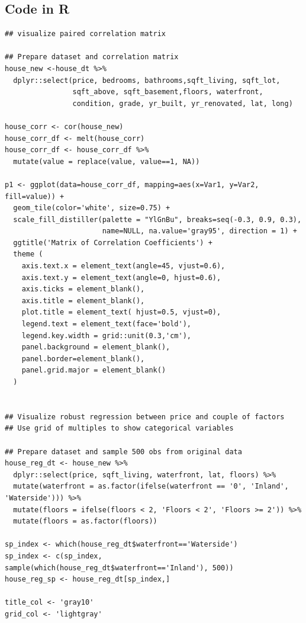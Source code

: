 \documentclass[11pt,letterpaper]{article}
\begin{document}
\newpage

\subsection*{Code in R}
\begin{verbatim}
## visualize paired correlation matrix

## Prepare dataset and correlation matrix
house_new <-house_dt %>% 
  dplyr::select(price, bedrooms, bathrooms,sqft_living, sqft_lot, 
                sqft_above, sqft_basement,floors, waterfront, 
                condition, grade, yr_built, yr_renovated, lat, long)

house_corr <- cor(house_new)
house_corr_df <- melt(house_corr)
house_corr_df <- house_corr_df %>% 
  mutate(value = replace(value, value==1, NA))

p1 <- ggplot(data=house_corr_df, mapping=aes(x=Var1, y=Var2, fill=value)) +
  geom_tile(color='white', size=0.75) + 
  scale_fill_distiller(palette = "YlGnBu", breaks=seq(-0.3, 0.9, 0.3), 
                       name=NULL, na.value='gray95', direction = 1) +
  ggtitle('Matrix of Correlation Coefficients') +
  theme (
    axis.text.x = element_text(angle=45, vjust=0.6),
    axis.text.y = element_text(angle=0, hjust=0.6), 
    axis.ticks = element_blank(),
    axis.title = element_blank(),
    plot.title = element_text( hjust=0.5, vjust=0),
    legend.text = element_text(face='bold'),
    legend.key.width = grid::unit(0.3,'cm'),
    panel.background = element_blank(),
    panel.border=element_blank(),
    panel.grid.major = element_blank()
  )
  
  
## Visualize robust regression between price and couple of factors
## Use grid of multiples to show categorical variables

## Prepare dataset and sample 500 obs from original data 
house_reg_dt <- house_new %>% 
  dplyr::select(price, sqft_living, waterfront, lat, floors) %>%
  mutate(waterfront = as.factor(ifelse(waterfront == '0', 'Inland', 'Waterside'))) %>%
  mutate(floors = ifelse(floors < 2, 'Floors < 2', 'Floors >= 2')) %>%
  mutate(floors = as.factor(floors))

sp_index <- which(house_reg_dt$waterfront=='Waterside')
sp_index <- c(sp_index, sample(which(house_reg_dt$waterfront=='Inland'), 500))
house_reg_sp <- house_reg_dt[sp_index,]

title_col <- 'gray10'
grid_col <- 'lightgray'


\end{verbatim}
\end{document}
